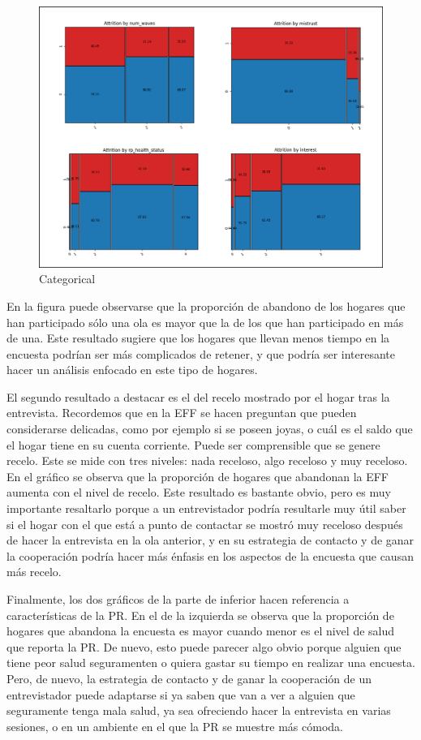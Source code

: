 \begin{figure}
	\centering
	\includegraphics[width=1\textwidth]{figs/categorical.png}
	\caption{Categorical}
	\label{fig:categorical}
\end{figure}

En la figura puede observarse que la proporción de abandono de los hogares que han participado sólo una ola es mayor que la de los que han participado en más de una. Este resultado sugiere que los hogares que llevan menos tiempo en la encuesta podrían ser más complicados de retener, y que podría ser interesante hacer un análisis enfocado en este tipo de hogares.

El segundo resultado a destacar es el del recelo mostrado por el hogar tras la entrevista. Recordemos que en la EFF se hacen preguntan que pueden considerarse delicadas, como por ejemplo si se poseen joyas, o cuál es el saldo que el hogar tiene en su cuenta corriente. Puede ser comprensible que se genere recelo. Este se mide con tres niveles: nada receloso, algo receloso y muy receloso. En el gráfico se observa que la proporción de hogares que abandonan la EFF aumenta con el nivel de recelo. Este resultado es bastante obvio, pero es muy importante resaltarlo porque a un entrevistador podría resultarle muy útil saber si el hogar con el que está a punto de contactar se mostró muy receloso después de hacer la entrevista en la ola anterior, y en su estrategia de contacto y de ganar la cooperación podría hacer más énfasis en los aspectos de la encuesta que causan más recelo.

Finalmente, los dos gráficos de la parte de inferior hacen referencia a características de la PR. En el de la izquierda se observa que la proporción de hogares que abandona la encuesta es mayor cuando menor es el nivel de salud que reporta la PR. De nuevo, esto puede parecer algo obvio porque alguien que tiene peor salud seguramenten o quiera gastar su tiempo en realizar una encuesta. Pero, de nuevo, la estrategia de contacto y de ganar la cooperación de un entrevistador puede adaptarse si ya saben que van a ver a alguien que seguramente tenga mala salud, ya sea ofreciendo hacer la entrevista en varias sesiones, o en un ambiente en el que la PR se muestre más cómoda.

